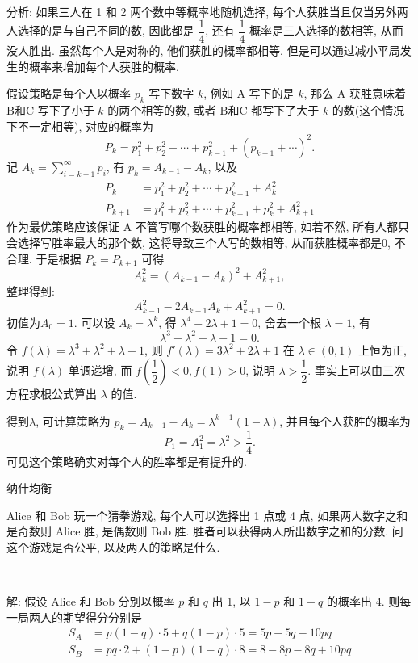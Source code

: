 ~

分析: 如果三人在 1 和 2 两个数中等概率地随机选择, 每个人获胜当且仅当另外两人选择的是与自己不同的数, 因此都是 $\dfrac{1}{4}$, 还有 $\dfrac{1}{4}$ 概率是三人选择的数相等, 从而没人胜出. 虽然每个人是对称的, 他们获胜的概率都相等, 但是可以通过减小平局发生的概率来增加每个人获胜的概率.

假设策略是每个人以概率 $p_k$ 写下数字 $k$, 例如 A 写下的是 $k$, 那么 A 获胜意味着 B和C 写下了小于 $k$ 的两个相等的数, 或者 B和C 都写下了大于 $k$ 的数(这个情况下不一定相等), 对应的概率为
\[P_k = p_1^2+p_2^2+\cdots+p_{k-1}^2+(p_{k+1}+\cdots)^2 .\]
记 $\displaystyle A_k = \sum_{i=k+1}^\infty p_i$, 有 $p_k = A_{k-1} - A_k$, 以及
\begin{align*}
P_k &= p_1^2+p_2^2+\cdots+p_{k-1}^2+A_k^2 \\
P_{k+1} &= p_1^2+p_2^2+\cdots+p_{k-1}^2+p_k^2 + A_{k+1}^2
\end{align*}
作为最优策略应该保证 A 不管写哪个数获胜的概率都相等, 如若不然, 所有人都只会选择写胜率最大的那个数, 这将导致三个人写的数相等, 从而获胜概率都是0, 不合理. 于是根据 $P_k = P_{k+1}$ 可得
\[ A_k^2 = (A_{k-1}-A_k)^2 + A_{k+1}^2 ,\]
整理得到: 
\[A_{k-1}^2 - 2A_{k-1}A_k + A_{k+1}^2 = 0.\]
初值为$A_0 = 1$. 可以设 $A_k = \lambda^k$, 得 $\lambda^4-2\lambda + 1 = 0$, 舍去一个根 $\lambda = 1$, 有
\[ \lambda^3 + \lambda^2 + \lambda - 1 = 0 .\]
令 $f(\lambda) = \lambda^3 + \lambda^2 + \lambda - 1$, 则 $f'(\lambda) = 3\lambda^2 + 2\lambda + 1$ 在 $\lambda \in (0,1)$ 上恒为正, 说明 $f(\lambda)$ 单调递增, 而 $f(\dfrac{1}{2}) < 0, f(1) > 0$, 说明 $\lambda > \dfrac{1}{2}$. 事实上可以由三次方程求根公式算出 $\lambda$ 的值.

得到$\lambda$, 可计算策略为 $p_k = A_{k-1}-A_k = \lambda^{k-1}(1-\lambda)$, 并且每个人获胜的概率为
\[P_1 = A_1^2 = \lambda^2 > \frac{1}{4} .\]
可见这个策略确实对每个人的胜率都是有提升的.


\newpage
\noindent 纳什均衡

Alice 和 Bob 玩一个猜拳游戏, 每个人可以选择出 1 点或 4 点, 如果两人数字之和是奇数则 Alice 胜, 是偶数则 Bob 胜. 胜者可以获得两人所出数字之和的分数. 问这个游戏是否公平, 以及两人的策略是什么.

~

解: 假设 Alice 和 Bob 分别以概率 $p$ 和 $q$ 出 1, 以 $1-p$ 和 $1-q$ 的概率出 4. 则每一局两人的期望得分分别是 
\begin{align*}
S_A &= p(1-q)\cdot 5 + q(1-p) \cdot 5 = 5p+5q-10pq \\
S_B &= pq \cdot 2 + (1-p)(1-q)\cdot 8 = 8-8p-8q+10pq
\end{align*}

